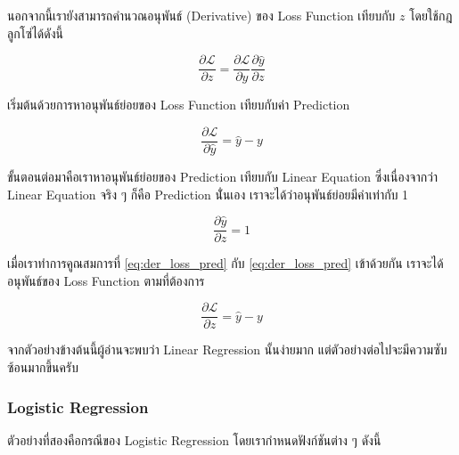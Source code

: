 นอกจากนี้เรายังสามารถคำนวณอนุพันธ์ (Derivative) ของ Loss Function เทียบกับ $z$ โดยใช้กฎลูกโซ่ได้ดังนี้

\begin{equation}\label{eq:loss_chain_rule}
    \frac{\partial \mathcal{L}}{\partial z} = 
    \frac{\partial \mathcal{L}}{\partial \hat{y}} \frac{\partial \hat{y}}{\partial z}
\end{equation}

\noindent เริ่มต้นด้วยการหาอนุพันธ์ย่อยของ Loss Function เทียบกับค่า Prediction

\begin{equation}\label{eq:der_loss_pred}
    \frac{\partial \mathcal{L}}{\partial \hat{y}} = \hat{y} - y
\end{equation}

\noindent ขั้นตอนต่อมาคือเราหาอนุพันธ์ย่อยของ Prediction เทียบกับ Linear Equation ซึ่งเนื่องจากว่า Linear Equation จริง ๆ 
ก็คือ Prediction นั่่นเอง เราจะได้ว่าอนุพันธ์ย่อยมีค่าเท่ากับ 1

\begin{equation}\label{eq:der_pred_lin_eq}
    \frac{\partial \hat{y}}{\partial z} = 1
\end{equation}

\noindent เมื่อเราทำการคูณสมการที่ \ref{eq:der_loss_pred} กับ \ref{eq:der_loss_pred} เข้าด้วยกัน เราจะได้อนุพันธ์ของ Loss 
Function ตามที่ต้องการ 

\begin{equation}\label{eq:der_loss_lin_eq}
    \frac{\partial \mathcal{L}}{\partial z} = \hat{y} - y
\end{equation}

\noindent จากตัวอย่างข้างต้นนี้ผู้อ่านจะพบว่า Linear Regression นั้นง่ายมาก แต่ตัวอย่างต่อไปจะมีความซับซ้อนมากขึ้นครับ

\subsubsection{Logistic Regression}

ตัวอย่างที่สองคือกรณีของ Logistic Regression โดยเรากำหนดฟังก์ชันต่าง ๆ ดังนี้


